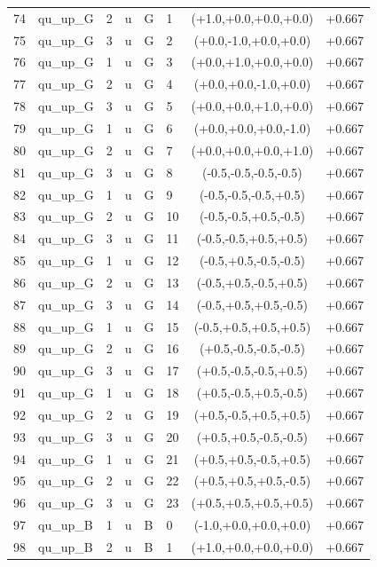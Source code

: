 \begin{longtable}{rlllllcl}
74 & qu\_up\_G & 2 & u & G & 1 & (+1.0,+0.0,+0.0,+0.0) & +0.667 \\
75 & qu\_up\_G & 3 & u & G & 2 & (+0.0,-1.0,+0.0,+0.0) & +0.667 \\
76 & qu\_up\_G & 1 & u & G & 3 & (+0.0,+1.0,+0.0,+0.0) & +0.667 \\
77 & qu\_up\_G & 2 & u & G & 4 & (+0.0,+0.0,-1.0,+0.0) & +0.667 \\
78 & qu\_up\_G & 3 & u & G & 5 & (+0.0,+0.0,+1.0,+0.0) & +0.667 \\
79 & qu\_up\_G & 1 & u & G & 6 & (+0.0,+0.0,+0.0,-1.0) & +0.667 \\
80 & qu\_up\_G & 2 & u & G & 7 & (+0.0,+0.0,+0.0,+1.0) & +0.667 \\
81 & qu\_up\_G & 3 & u & G & 8 & (-0.5,-0.5,-0.5,-0.5) & +0.667 \\
82 & qu\_up\_G & 1 & u & G & 9 & (-0.5,-0.5,-0.5,+0.5) & +0.667 \\
83 & qu\_up\_G & 2 & u & G & 10 & (-0.5,-0.5,+0.5,-0.5) & +0.667 \\
84 & qu\_up\_G & 3 & u & G & 11 & (-0.5,-0.5,+0.5,+0.5) & +0.667 \\
85 & qu\_up\_G & 1 & u & G & 12 & (-0.5,+0.5,-0.5,-0.5) & +0.667 \\
86 & qu\_up\_G & 2 & u & G & 13 & (-0.5,+0.5,-0.5,+0.5) & +0.667 \\
87 & qu\_up\_G & 3 & u & G & 14 & (-0.5,+0.5,+0.5,-0.5) & +0.667 \\
88 & qu\_up\_G & 1 & u & G & 15 & (-0.5,+0.5,+0.5,+0.5) & +0.667 \\
89 & qu\_up\_G & 2 & u & G & 16 & (+0.5,-0.5,-0.5,-0.5) & +0.667 \\
90 & qu\_up\_G & 3 & u & G & 17 & (+0.5,-0.5,-0.5,+0.5) & +0.667 \\
91 & qu\_up\_G & 1 & u & G & 18 & (+0.5,-0.5,+0.5,-0.5) & +0.667 \\
92 & qu\_up\_G & 2 & u & G & 19 & (+0.5,-0.5,+0.5,+0.5) & +0.667 \\
93 & qu\_up\_G & 3 & u & G & 20 & (+0.5,+0.5,-0.5,-0.5) & +0.667 \\
94 & qu\_up\_G & 1 & u & G & 21 & (+0.5,+0.5,-0.5,+0.5) & +0.667 \\
95 & qu\_up\_G & 2 & u & G & 22 & (+0.5,+0.5,+0.5,-0.5) & +0.667 \\
96 & qu\_up\_G & 3 & u & G & 23 & (+0.5,+0.5,+0.5,+0.5) & +0.667 \\
97 & qu\_up\_B & 1 & u & B & 0 & (-1.0,+0.0,+0.0,+0.0) & +0.667 \\
98 & qu\_up\_B & 2 & u & B & 1 & (+1.0,+0.0,+0.0,+0.0) & +0.667 \\

\end{longtable}

